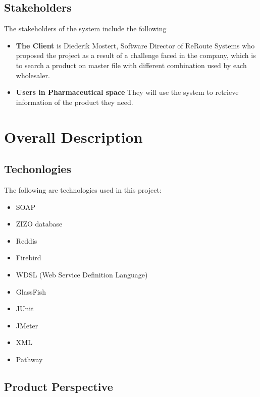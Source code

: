 \documentclass[a4paper,10pt]{article}
\begin{document}
	\subsection{Stakeholders}
	The stakeholders of the system include the following
	\begin{itemize}
	\item \textbf{The Client} is Diederik Mostert, Software Director of ReRoute Systems who proposed the project as a result of a challenge faced in the company, which is to search a product on master file with different combination used by each wholesaler.
	\item \textbf{Users in Pharmaceutical space} They will use the system to retrieve information of the product they need.
	\end{itemize}

	\newpage

\section{Overall Description}

\subsection{Techonlogies}{
	The following are technologies used in this project:
	\begin{itemize}
		\item SOAP
		\item ZIZO database
		\item Reddis
		\item Firebird
		\item WDSL (Web Service Definition Language)
		\item GlassFish
		\item JUnit
		\item JMeter
		\item XML
		\item Pathway
	\end{itemize}
}
	
\subsection{Product Perspective}
\end{document}
